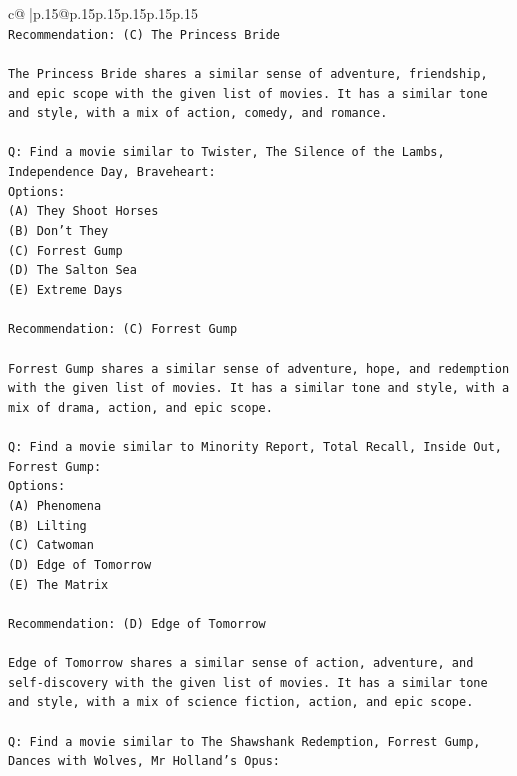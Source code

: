 \documentclass{article}
\begin{document}
{\begin{supertabular}{c@{$\;$}|p{.15\linewidth}@{}p{.15\linewidth}p{.15\linewidth}p{.15\linewidth}p{.15\linewidth}p{.15\linewidth}}
{{{\\ 
\texttt{Recommendation: (C) The Princess Bride} \\
\\ 
\texttt{The Princess Bride shares a similar sense of adventure, friendship, and epic scope with the given list of movies. It has a similar tone and style, with a mix of action, comedy, and romance.} \\
\\ 
\texttt{Q: Find a movie similar to Twister, The Silence of the Lambs, Independence Day, Braveheart:} \\
\texttt{Options:} \\
\texttt{(A) They Shoot Horses} \\
\texttt{(B) Don't They} \\
\texttt{(C) Forrest Gump} \\
\texttt{(D) The Salton Sea} \\
\texttt{(E) Extreme Days} \\
\\ 
\texttt{Recommendation: (C) Forrest Gump} \\
\\ 
\texttt{Forrest Gump shares a similar sense of adventure, hope, and redemption with the given list of movies. It has a similar tone and style, with a mix of drama, action, and epic scope.} \\
\\ 
\texttt{Q: Find a movie similar to Minority Report, Total Recall, Inside Out, Forrest Gump:} \\
\texttt{Options:} \\
\texttt{(A) Phenomena} \\
\texttt{(B) Lilting} \\
\texttt{(C) Catwoman} \\
\texttt{(D) Edge of Tomorrow} \\
\texttt{(E) The Matrix} \\
\\ 
\texttt{Recommendation: (D) Edge of Tomorrow} \\
\\ 
\texttt{Edge of Tomorrow shares a similar sense of action, adventure, and self{-}discovery with the given list of movies. It has a similar tone and style, with a mix of science fiction, action, and epic scope.} \\
\\ 
\texttt{Q: Find a movie similar to The Shawshank Redemption, Forrest Gump, Dances with Wolves, Mr Holland's Opus:} \\
}}}
\end{supertabular}}
\end{document}
